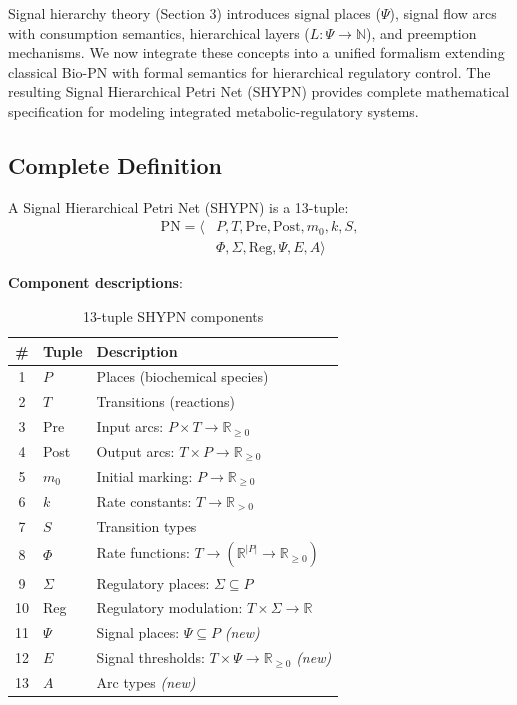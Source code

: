 
Signal hierarchy theory (Section 3) introduces signal places ($\Psi$), signal flow arcs with consumption semantics, hierarchical layers ($L: \Psi \to \mathbb{N}$), and preemption mechanisms. We now integrate these concepts into a unified formalism extending classical Bio-PN with formal semantics for hierarchical regulatory control. The resulting Signal Hierarchical Petri Net (SHYPN) provides complete mathematical specification for modeling integrated metabolic-regulatory systems.

\subsection{Complete Definition}

\begin{definition}
A Signal Hierarchical Petri Net (SHYPN) is a 13-tuple:
\begin{align*}
\text{PN} = \langle &P, T, \text{Pre}, \text{Post}, m_0, k, S, \\
&\Phi, \Sigma, \text{Reg}, \Psi, E, A \rangle
\end{align*}
\end{definition}

\textbf{Component descriptions}:

\begin{table}[h]
\caption{13-tuple SHYPN components}
\centering
\small
\begin{tabular}{@{}cp{1.0cm}p{5.8cm}@{}}
\toprule
\# & \textbf{Tuple} & \textbf{Description} \\
\midrule
1 & $P$ & Places (biochemical species) \\
2 & $T$ & Transitions (reactions) \\
3 & Pre & Input arcs: $P \times T \to \mathbb{R}_{\geq 0}$ \\
4 & Post & Output arcs: $T \times P \to \mathbb{R}_{\geq 0}$ \\
5 & $m_0$ & Initial marking: $P \to \mathbb{R}_{\geq 0}$ \\
6 & $k$ & Rate constants: $T \to \mathbb{R}_{> 0}$ \\
7 & $S$ & Transition types \\
8 & $\Phi$ & Rate functions: $T \to (\mathbb{R}^{|P|} \to \mathbb{R}_{\geq 0})$ \\
9 & $\Sigma$ & Regulatory places: $\Sigma \subseteq P$ \\
10 & Reg & Regulatory modulation: $T \times \Sigma \to \mathbb{R}$ \\
11 & $\Psi$ & Signal places: $\Psi \subseteq P$ \textit{(new)} \\
12 & $E$ & Signal thresholds: $T \times \Psi \to \mathbb{R}_{\geq 0}$ \textit{(new)} \\
13 & $A$ & Arc types \textit{(new)} \\
\bottomrule
\end{tabular}
\end{table}

